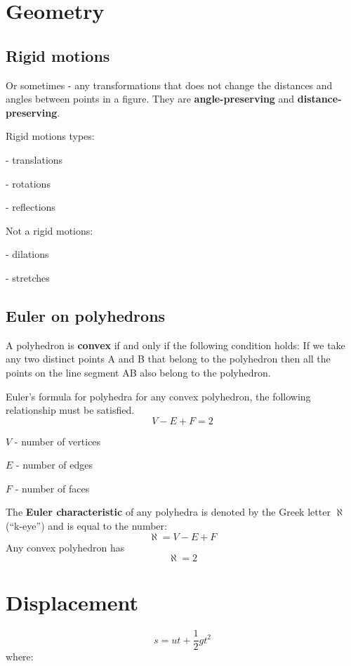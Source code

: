 \documentclass{article}
\begin{document}
\section{Geometry}
\subsection{Rigid motions}
Or sometimes - any transformations that does not change the distances
and angles between points in a figure. They are \textbf{angle-preserving} and
\textbf{distance-preserving}.


Rigid motions types:

- translations

- rotations

- reflections


Not a rigid motions:

- dilations

- stretches

\subsection{Euler on polyhedrons}
A polyhedron is \textbf{convex} if and only if the following condition
holds:
If we take any two distinct points A and B that belong to the polyhedron
then all the points on the line segment AB also belong to the polyhedron.

Euler's formula for polyhedra for any convex polyhedron, the following
relationship must be satisfied.
\begin{equation}
  V - E + F = 2
\end{equation}

$V$ - number of vertices

$E$ - number of edges

$F$ - number of faces

The \textbf{Euler characteristic} of any polyhedra is denoted by the
Greek letter $\aleph$ (``k-eye'') and is equal to the number:
\begin{equation}
  \aleph = V - E + F
\end{equation}
Any convex polyhedron has
\begin{equation}
  \aleph = 2
\end{equation}
\section{Displacement}
\begin{equation}
  s = ut+\frac{1}{2}gt^2
\end{equation}
where:
\end{document}
